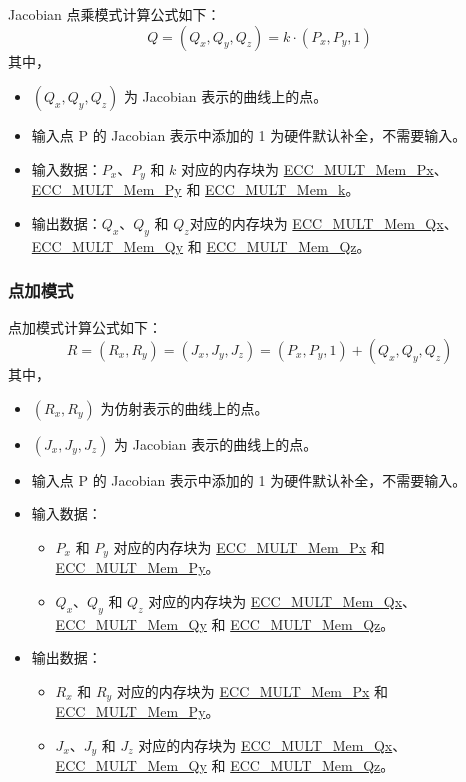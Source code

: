 \documentclass[main\_\_CN.tex]{subfiles}
\begin{document}
Jacobian 点乘模式计算公式如下：
\[
Q = (Q_x,Q_y,Q_z) = k \cdot (P_x,P_y,1)
\]
其中，
\begin{itemize}
    \item $(Q_x,Q_y,Q_z)$ 为 Jacobian 表示的曲线上的点。
    \item 输入点 P 的 Jacobian 表示中添加的 1 为硬件默认补全，不需要输入。
    \item 输入数据：$P_x$、$P_y$ 和 $k$ 对应的内存块为 \hyperref[tab:ecc-memory]{ECC\_MULT\_Mem\_Px}、\hyperref[tab:ecc-memory]{ECC\_MULT\_Mem\_Py} 和 \hyperref[tab:ecc-memory]{ECC\_MULT\_Mem\_k}。
    \item 输出数据：$Q_x$、$Q_y$ 和 $Q_z$对应的内存块为 \hyperref[tab:ecc-memory]{ECC\_MULT\_Mem\_Qx}、\hyperref[tab:ecc-memory]{ECC\_MULT\_Mem\_Qy} 和 \hyperref[tab:ecc-memory]{ECC\_MULT\_Mem\_Qz}。
\end{itemize}

\subsubsection{点加模式}

点加模式计算公式如下：
\[
R = (R_x,R_y) = (J_x,J_y,J_z) = (P_x,P_y,1) + (Q_x,Q_y,Q_z)
\]
其中，
\begin{itemize}
    \item $(R_x,R_y)$ 为仿射表示的曲线上的点。
    \item $(J_x,J_y,J_z)$ 为 Jacobian 表示的曲线上的点。
    \item 输入点 P 的 Jacobian 表示中添加的 1 为硬件默认补全，不需要输入。
    \item 输入数据：
    \begin{itemize}
        \item $P_x$ 和 $P_y$ 对应的内存块为 \hyperref[tab:ecc-memory]{ECC\_MULT\_Mem\_Px} 和 \hyperref[tab:ecc-memory]{ECC\_MULT\_Mem\_Py}。
        \item $Q_x$、$Q_y$ 和 $Q_z$ 对应的内存块为 \hyperref[tab:ecc-memory]{ECC\_MULT\_Mem\_Qx}、\hyperref[tab:ecc-memory]{ECC\_MULT\_Mem\_Qy} 和 \hyperref[tab:ecc-memory]{ECC\_MULT\_Mem\_Qz}。
    \end{itemize}
    \item 输出数据：
    \begin{itemize}
        \item $R_x$ 和 $R_y$ 对应的内存块为 \hyperref[tab:ecc-memory]{ECC\_MULT\_Mem\_Px} 和 \hyperref[tab:ecc-memory]{ECC\_MULT\_Mem\_Py}。
        \item $J_x$、$J_y$ 和 $J_z$ 对应的内存块为 \hyperref[tab:ecc-memory]{ECC\_MULT\_Mem\_Qx}、\hyperref[tab:ecc-memory]{ECC\_MULT\_Mem\_Qy} 和 \hyperref[tab:ecc-memory]{ECC\_MULT\_Mem\_Qz}。
    \end{itemize}
\end{itemize}
\end{document}
